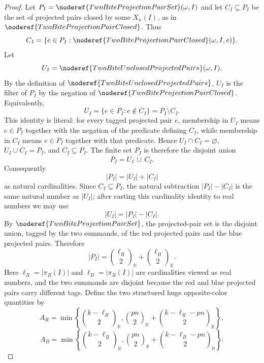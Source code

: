 \begin{proof}
Let \(P_I=\noderef{TwoBiteProjectionPairSet}(\omega,I)\) and let
\(C_I\subseteq P_I\) be the set of projected pairs closed by some \(X_x(I)\),
as in \(\noderef{TwoBiteProjectionPairClosed}\).  Thus
\[
C_I=\{e\in P_I: \noderef{TwoBiteProjectionPairClosed}(\omega,I,e)\}.
\]
Let
\[
U_I=\noderef{TwoBiteUnclosedProjectedPairs}(\omega,I).
\]
By the definition of \(\noderef{TwoBiteUnclosedProjectedPairs}\), \(U_I\) is
the filter of \(P_I\) by the negation of
\(\noderef{TwoBiteProjectionPairClosed}\).  Equivalently,
\[
U_I=\{e\in P_I:e\notin C_I\}=P_I\setminus C_I.
\]
This identity is literal: for every tagged projected pair \(e\), membership in
\(U_I\) means \(e\in P_I\) together with the negation of the predicate defining
\(C_I\), while membership in \(C_I\) means \(e\in P_I\) together with that
predicate.  Hence \(U_I\cap C_I=\varnothing\), \(U_I\cup C_I=P_I\), and
\(C_I\subseteq P_I\).  The finite set \(P_I\) is therefore the disjoint union
\[
P_I=U_I\,\dot\cup\, C_I.
\]
Consequently
\[
|P_I|=|U_I|+|C_I|
\]
as natural cardinalities.  Since \(C_I\subseteq P_I\), the natural subtraction
\(|P_I|-|C_I|\) is the same natural number as \(|U_I|\); after casting this
cardinality identity to real numbers we may use
\[
|U_I|=|P_I|-|C_I|.
\]
By \(\noderef{TwoBiteProjectionPairSet}\), the projected-pair set is the
disjoint union, tagged by the two summands, of the red projected pairs and the
blue projected pairs.  Therefore
\[
|P_I|=\binom{\ell_R}{2}_{\mathbb R}
     +\binom{\ell_B}{2}_{\mathbb R}.
\]
Here \(\ell_R=|\pi_R(I)|\) and \(\ell_B=|\pi_B(I)|\) are cardinalities viewed
as real numbers, and the two summands are disjoint because the red and blue
projected pairs carry different tags.
Define the two structured huge opposite-color quantities by
\[
A_R=
\min\left\{\binom{k-\ell_R}{2}_{\mathbb R},
  \binom{pn}{2}_{\mathbb R}+\binom{k-\ell_R-pn}{2}_{\mathbb R}\right\},
\]
\[
A_B=
\min\left\{\binom{k-\ell_B}{2}_{\mathbb R},
  \binom{pn}{2}_{\mathbb R}+\binom{k-\ell_B-pn}{2}_{\mathbb R}\right\}.
\]


\end{proof}
